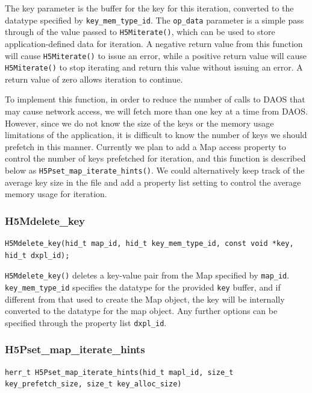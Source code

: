 The key parameter is the buffer for the key for this iteration, converted to the datatype specified by \verb+key_mem_type_id+. The \verb+op_data+ parameter is a simple pass through of the value passed to \verb+H5Miterate()+, which can be used to store application-defined data for iteration. A negative return value from this function will cause \verb+H5Miterate()+ to issue an error, while a positive return value will cause \verb+H5Miterate()+ to stop iterating and return this value without issuing an error. A return value of zero allows iteration to continue.

To implement this function, in order to reduce the number of calls to DAOS that may cause network access, we will fetch more than one key at a time from DAOS. However, since we do not know the size of the keys or the memory usage limitations of the application, it is difficult to know the number of keys we should prefetch in this manner. Currently we plan to add a Map access property to control the number of keys prefetched for iteration, and this function is described below as \verb+H5Pset_map_iterate_hints()+. We could alternatively keep track of the average key size in the file and add a property list setting to control the average memory usage for iteration.

\subsubsection{H5Mdelete\_key}

{
\begin{lstlisting}
H5Mdelete_key(hid_t map_id, hid_t key_mem_type_id, const void *key, hid_t dxpl_id);
\end{lstlisting}
}

\verb+H5Mdelete_key()+ deletes a key-value pair from the Map specified by \verb+map_id+. \verb+key_mem_type_id+ specifies the datatype for the provided \verb+key+ buffer, and if different from that used to create the Map object, the key will be internally converted to the datatype for the map object. Any further options can be specified through the property list \verb+dxpl_id+.

\subsubsection{H5Pset\_map\_iterate\_hints}

{
\begin{lstlisting}
herr_t H5Pset_map_iterate_hints(hid_t mapl_id, size_t key_prefetch_size, size_t key_alloc_size)
\end{lstlisting}
}

